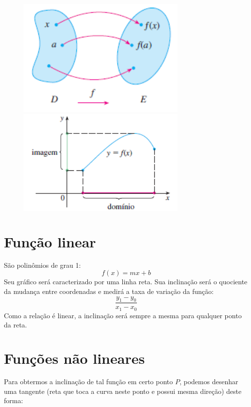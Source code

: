 \documentclass[12pt,a4paper,oneside,brazil]{abntex2}
\begin{document}
\begin{figure}[ht]
\centering
    \begin{minipage}{0.45\textwidth}
        \centering
        \includegraphics[width=0.75\textwidth]{Dominio.PNG}
        \caption{\cite[p. 11]{stewart}}
     \end{minipage}\hfill
     \begin{minipage}{0.45\textwidth}
        \centering
        \includegraphics[width=0.75\textwidth]{Dominio2.PNG}
        \caption{\cite[p. 11]{stewart}}
    \end{minipage}
\end{figure}

\section{Função linear}
São polinômios de grau 1:
\[ f(x) = m x + b \]
Seu gráfico será caracterizado por uma linha reta. Sua inclinação será o quociente da mudança entre coordenadas e medirá a taxa de variação da função:
\[ \frac{y_1 - y_0}{x_1 -x_0} \]
Como a relação é linear, a inclinação será sempre a mesma para qualquer ponto da reta.


\section{Funções não lineares}
Para obtermos a inclinação de tal função em certo ponto $P$, podemos desenhar uma tangente (reta que toca a curva neste ponto e possui mesma direção) deste forma:
\end{document}
